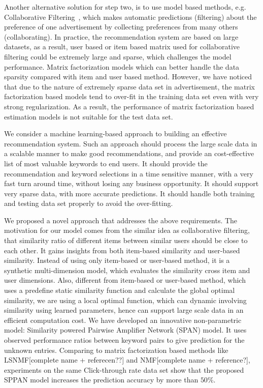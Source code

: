 Another alternative solution for step two, is to use model based
methods, e.g. Collaborative Filtering~\cite{resnick1997recommender,
  sarwar2001item}, which makes automatic predictions (filtering) about
the preference of one advertisement by collecting preferences from
many others (collaborating). In practice, the recommendation system
are based on large datasets, as a result, user based or item based
matrix used for collaborative filtering could be extremely large and
sparse, which challenges the model performance. Matrix factorization
models \cite{??} which can better handle the data sparsity compared
with item and user based method.  However, we have noticed that due to
the nature of extremely sparse data set in advertisement, the matrix
factorization based models tend to over-fit in the training data set
even with very strong regularization. As a result, the performance of
matrix factorization based estimation models is not suitable for the
test data set.

We consider a machine learning-based approach to building an effective
recommendation system. Such an approach should process the large scale
data in a scalable manner to make good recommendations, and provide an
cost-effective list of most valuable keywords to end users. It should
provide the recommendation and keyword selections in a time sensitive
manner, with a very fast turn around time, without losing any business
opportunity.  It should support very sparse data, with more accurate
predictions. It should handle both training and testing data set
properly to avoid the over-fitting.
 
We proposed a novel approach that addresses the above
requirements. The motivation for our model comes from the similar idea
as collaborative filtering, that similarity ratio of different items
between similar users should be close to each other. It gains insights
from both item-based similarity and user-based similarity. Instead of
using only item-based or user-based method, it is a synthetic
multi-dimension model, which evaluates the similarity cross item and
user dimensions. Also, different from item-based or user-based method,
which uses a predefine static similarity function and calculate the
global optimal similarity, we are using a local optimal function,
which can dynamic involving similarity using learned parameters, hence
can support large scale data in an efficient computation cost.  We
have developed an innovative non-parametric model: Similarity powered
Pairwise Amplifier Network (SPAN) model. It uses observed performance
ratios between keyword pairs to give prediction for the unknown
entries. Comparing to matrix factorization based methods like
LSNMF[complete name + referecen??] and NMF[complete name +
  reference?], experiments on the same Click-through rate data set
show that the proposed SPPAN model increases the prediction accuracy
by more than $50\%$.

